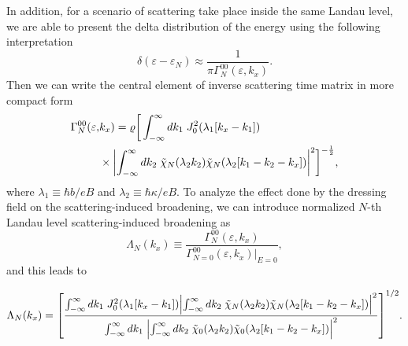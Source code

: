 In addition, for a scenario of scattering take place inside the same Landau level, we are able to present the delta distribution of the energy using the following interpretation \cite{dini16}
\begin{equation} \label{eq_16}
 \delta(\varepsilon - \varepsilon_{N}) \approx
 \frac{1}{\pi \Gamma^{00}_{N}(\varepsilon,k_x)}.
\end{equation}
Then we can write the central element of inverse scattering time matrix in more compact form
\begin{equation} \label{eq_17}
  \begin{aligned}
    \Gamma^{00}_{N}(\varepsilon,& k_x) =
    \varrho
    \bigg[
    \int_{-\infty}^{\infty} d {k}_1 \;
    J_0^2\qty(\lambda_1[{k}_x - {k}_1]) \\
    & \times
    \qty|
    \int_{-\infty}^{\infty} d{k}_2 \;
    \tilde{\chi}_{N}\qty(\lambda_2 k_2)
    \tilde{\chi}_{N}\qty(\lambda_2 \qty[{k}_1 - {k}_2 - {k}_x])|^2
    \bigg]^{-\frac{1}{2}},
  \end{aligned}
\end{equation}
where $ \lambda_1 \equiv \hbar b/eB$ and  $\lambda_2 \equiv \hbar \kappa/eB$.
To analyze the effect done by the dressing field on the scattering-induced broadening, we can introduce normalized $N$-th Landau level scattering-induced broadening as
\begin{equation} \label{eq_18}
    \Lambda_N(k_x) \equiv
    \frac{\Gamma^{00}_{N}(\varepsilon,k_x)}{\Gamma^{00}_{N=0}(\varepsilon,k_x)\big|_{E=0}},
\end{equation}
and this leads to
\begin{widetext}
\begin{equation} \label{eq_19}
    \Lambda_N (k_x) =
    \qty[
    \frac
    {\int_{-\infty}^{\infty} d {k}_1 \;
    J_0^2\qty(\lambda_1[{k}_x - {k}_1])
    \qty|
    \int_{-\infty}^{\infty} d{k}_2 \;
    \tilde{\chi}_{N}\qty(\lambda_2 k_2)
    \tilde{\chi}_{N}\qty(\lambda_2 \qty[{k}_1 - {k}_2 - {k}_x])|^2}
    {\int_{-\infty}^{\infty} d {k}_1 \;
    \qty|
    \int_{-\infty}^{\infty} d{k}_2 \;
    \tilde{\chi}_{0}\qty(\lambda_2 k_2)
    \tilde{\chi}_{0}\qty(\lambda_2 \qty[{k}_1 - {k}_2 - {k}_x])|^2}
    ]^{1/2}.
\end{equation}
\end{widetext}

